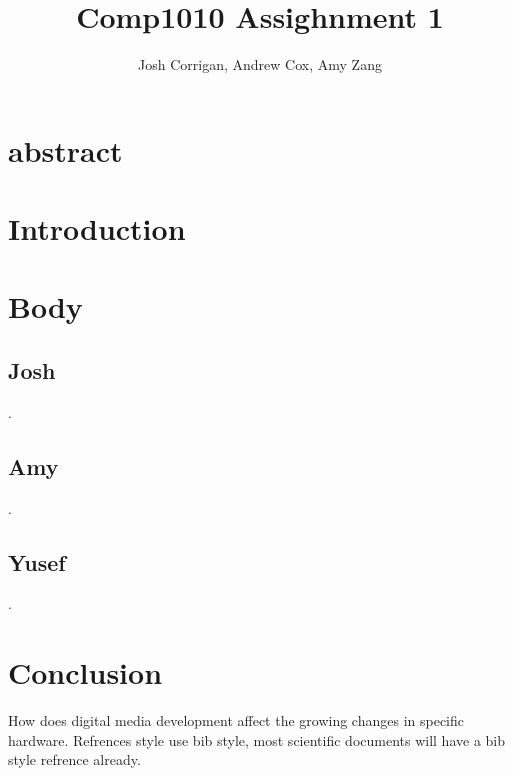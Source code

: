 \documentclass[12pt, times new roman]{article}
\title{\textbf{Comp1010 Assighnment 1}}
\author{Josh Corrigan, Andrew Cox, Amy Zang}
\begin{document}
\maketitle
\newpage
\section{abstract}
\newpage
\section{Introduction}
\section{Body}
	\subsection{Josh}
		.\newline
	\subsection{Amy}
		.\newline
	\subsection{Yusef}
		.\newline
\newpage
\section{Conclusion}
    How does digital media development affect the growing changes in specific hardware. \newline
    Refrences style use bib style, most scientific documents will have a bib style refrence already.
\end{document}
